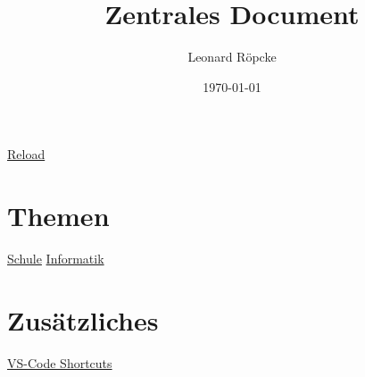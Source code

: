 \documentclass[12pt,a4paper]{article}
\title{Zentrales Document}
\author{Leonard Röpcke}
\date{\today}
\begin{document}
\maketitle
\noindent
\href{https://leonard-roepcke.github.io/Knowledge-Archive/main_docs/central_document/central_document.pdf}{Reload}
\section*{Themen}
\href{https://leonard-roepcke.github.io/Knowledge-Archive/main_docs/school/school.pdf}{Schule}
\break
\href{https://leonard-roepcke.github.io/Knowledge-Archive/main_docs/informatics/informatics.pdf}{Informatik}
\section{Zusätzliches}
\href{https://leonard-roepcke.github.io/Knowledge-Archive/knowledge/informatics/vsc_shortcuts/vsc_shortcuts.pdf}{VS-Code Shortcuts}
\end{document}
